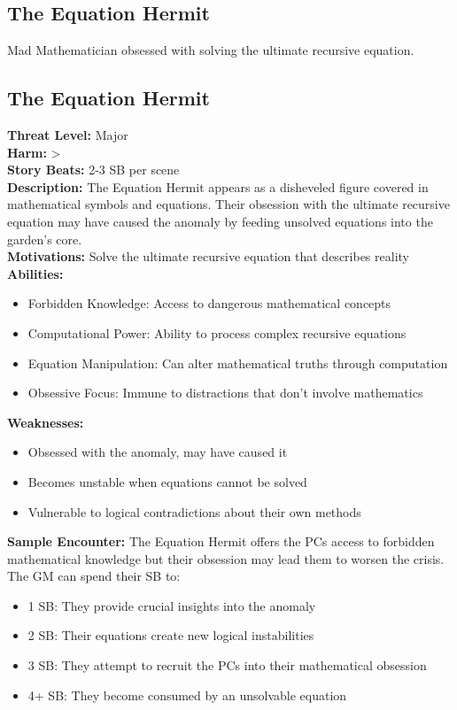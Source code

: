 \documentclass[11pt]{article}
\newenvironment{monsterentry}[1]{%
  \begin{mdframed}[backgroundcolor=shadecolor, linewidth=0pt, leftmargin=0pt, rightmargin=0pt]%
  \subsection*{#1}%
}{%
  \end{mdframed}%
}
\begin{document}
\subsection{The Equation Hermit}

Mad Mathematician obsessed with solving the ultimate recursive equation.

\begin{monsterentry}{The Equation Hermit}
\textbf{Threat Level:} Major \\
\textbf{Harm:} \textgreater \\
\textbf{Story Beats:} 2-3 SB per scene \\
\textbf{Description:} The Equation Hermit appears as a disheveled figure covered in mathematical symbols and equations. Their obsession with the ultimate recursive equation may have caused the anomaly by feeding unsolved equations into the garden's core. \\
\textbf{Motivations:} Solve the ultimate recursive equation that describes reality \\
\textbf{Abilities:}
\begin{itemize}
\item Forbidden Knowledge: Access to dangerous mathematical concepts
\item Computational Power: Ability to process complex recursive equations
\item Equation Manipulation: Can alter mathematical truths through computation
\item Obsessive Focus: Immune to distractions that don't involve mathematics
\end{itemize}
\textbf{Weaknesses:}
\begin{itemize}
\item Obsessed with the anomaly, may have caused it
\item Becomes unstable when equations cannot be solved
\item Vulnerable to logical contradictions about their own methods
\end{itemize}
\textbf{Sample Encounter:} The Equation Hermit offers the PCs access to forbidden mathematical knowledge but their obsession may lead them to worsen the crisis. The GM can spend their SB to:
\begin{itemize}
\item 1 SB: They provide crucial insights into the anomaly
\item 2 SB: Their equations create new logical instabilities
\item 3 SB: They attempt to recruit the PCs into their mathematical obsession
\item 4+ SB: They become consumed by an unsolvable equation
\end{itemize}
\end{monsterentry}
\end{document}
